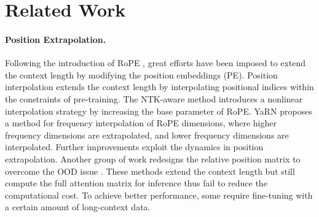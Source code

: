 \section{Related Work}
\paragraph{Position Extrapolation.}
Following the introduction of RoPE \citep{su2024roformer}, great efforts have been imposed to extend the context length by modifying the position embeddings (PE).
Position interpolation  \cite{chen2023extending, kaiokendev} extends the context length by interpolating positional indices within the constraints of pre-training. 
The NTK-aware method \citep{bloc97ntk,Rozire2023CodeLO,Liu2023ScalingLO} introduces a nonlinear interpolation strategy by increasing the base parameter of RoPE. YaRN \citep{peng2023yarn} proposes a method for frequency interpolation of RoPE dimensions, where higher frequency dimensions are extrapolated, and lower frequency dimensions are interpolated. Further improvements \citep{chen2023clex,Ding2024LongRoPEEL} exploit the dynamics in position extrapolation.
Another group of work redesigns the relative position matrix to overcome the OOD issue \citep{JianlinSu,Jin2024LLMML,An2024TrainingFreeLS}. 
These methods extend the context length but still compute the full attention matrix for inference thus fail to reduce the computational cost. To achieve better performance, some require fine-tuning with a certain amount of long-context data.

